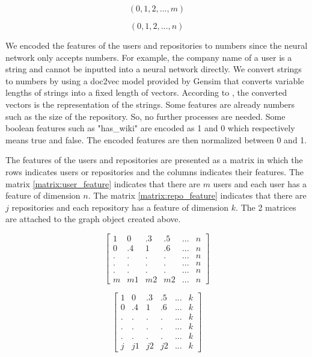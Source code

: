 \documentclass[11pt,twoside]{report}
\begin{document}
\begin{equation}
    (0, 1, 2, ..., m)
    \label{eq:users_tupple}
\end{equation}

\begin{equation}
    (0, 1, 2, ..., n)
    \label{eq:repos_tupple}
\end{equation}

We encoded the features of the users and repositories to numbers since the neural network only accepts numbers. For example, the company name of a user is a string and cannot be inputted into a neural network directly. We convert strings to numbers by using a doc2vec model \cite{le_distributed_nodate} provided by Gensim \cite{rehurek_lrec} that converts variable lengths of strings into a fixed length of vectors. According to \cite{mikolov_efficient_2013}, the converted vectors is the representation of the strings. Some features are already numbers such as the size of the repository. So, no further processes are needed. Some boolean features such as "has\_wiki" are encoded as 1 and 0 which respectively means true and false. The encoded features are then normalized between 0 and 1.

The features of the users and repositories are presented as a matrix in which the rows indicates users or repositories and the columns indicates their features. The matrix \ref{matrix:user_feature} indicates that there are $m$ users and each user has a feature of dimension $n$. The matrix \ref{matrix:repo_feature} indicates that there are $j$ repositories and each repository has a feature of dimension $k$. The 2 matrices are attached to the graph object created above.

\begin{equation}
    \begin{bmatrix}
        1 & 0 & .3 & .5 & ... & n \\
        0 & .4 & 1 & .6 & ... & n \\
        . & . & . & . & ... & n \\
        . & . & . & . & ... & n \\
        . & . & . & . & ... & n \\
        m & m1 & m2 & m2 & ... & n
        \label{matrix:user_feature}
    \end{bmatrix}
\end{equation}

\begin{equation}
    \begin{bmatrix}
        1 & 0 & .3 & .5 & ... & k \\
        0 & .4 & 1 & .6 & ... & k \\
        . & . & . & . & ... & k \\
        . & . & . & . & ... & k \\
        . & . & . & . & ... & k \\
        j & j1 & j2 & j2 & ... & k
        \label{matrix:repo_feature}
    \end{bmatrix}
\end{equation}
\end{document}
